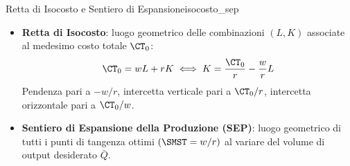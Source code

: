 \begin{definizione}{Retta di Isocosto e Sentiero di Espansione}{isocosto_sep}
\begin{itemize}
    \item \textbf{Retta di Isocosto}: luogo geometrico delle combinazioni $(L, K)$ associate al medesimo costo totale $\CT_0$:
    \begin{equation}
        \CT_0 = wL + rK \iff K = \frac{\CT_0}{r} - \frac{w}{r}L
    \end{equation}
    Pendenza pari a $-w/r$, intercetta verticale pari a $\CT_0/r$, intercetta orizzontale pari a $\CT_0/w$.
    \item \textbf{Sentiero di Espansione della Produzione (SEP)}: luogo geometrico di tutti i punti di tangenza ottimi $(\SMST = w/r)$ al variare del volume di output desiderato $\bar{Q}$.
\end{itemize}
\end{definizione}

